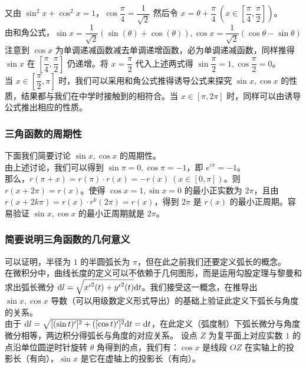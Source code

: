 \documentclass[UTF8,12pt]{ctexart}
\begin{document}
        又由 $\sin^2 x + \cos^2 x = 1$，$\cos \dfrac{\pi}{4} = \dfrac{1}{\sqrt 2}$
        然后令 $x = \theta + \dfrac{\pi}{4}\ (x \in [\dfrac{\pi}{4}, \dfrac{\pi}{2}])$。\\
        由和角公式，$\sin x = \dfrac{1}{\sqrt 2}(\sin (\theta) + \cos (\theta)), \cos x = \dfrac{1}{\sqrt 2}(\cos \theta - \sin \theta)$
        注意到 $\cos x$ 为单调递减函数减去单调递增函数，必为单调递减函数，同样推得 $\sin x$ 在 $[\dfrac{\pi}{4}, \dfrac{\pi}{2}]$ 仍递增。将 $x = \dfrac{\pi}{2}$ 代入上述两式得 $\sin \dfrac{\pi}{2} = 1, \cos \dfrac{\pi}{2} = 0$。\\
        当 $x \in [\dfrac{\pi}{2}, \pi]$ 时，我们可以采用和角公式推得诱导公式来探究 $\sin x, \cos x$ 的性质，结果都与我们在中学时接触到的相符合。当 $x \in [\pi, 2\pi]$ 时，同样可以由诱导公式推出相应的性质。
        
        \subsubsection{三角函数的周期性}
        下面我们简要讨论 $\sin x, \cos x$ 的周期性。\\
        由上述讨论，我们可以得到 $\sin \pi = 0, \cos \pi = -1$，即 $e^{i\pi} = -1$。\\
        那么，$r(\pi + x) = r(\pi)\cdot r(x) = -r(x)\ (x \in [0, \pi])$。则 $r(x + 2\pi) = r(x)$。使得 $\cos x = 1, \sin x = 0$ 的最小正实数为 $2\pi$，且由 $r(x + 2k\pi) = r(x) \cdot r^k(2\pi) = r(x)$，得到 $2\pi$ 是 $r(x)$ 的最小正周期。容易验证 $\sin x, \cos x$ 的最小正周期就是 $2\pi$。
        
        \subsubsection{简要说明三角函数的几何意义}
            可以证明，半径为 $1$ 的半圆弧长为 $\pi$，但在此之前我们还要定义弧长的概念。\\
            在微积分中，曲线长度的定义可以不依赖于几何图形，而是运用勾股定理与黎曼和求出弧长微分 ${\rm d}l = \sqrt{{x'}^2 (t) + {y'}^2 (t)}{\rm d}t$。我们接受这一概念，在推导出 $\sin x, \cos x$ 导数（可以用级数定义形式导出）的基础上验证此定义下弧长与角度的关系。\\
            由于 ${\rm d}l = \sqrt{[(\sin t)']^2 + ([\cos t)']^2}{\rm d} t = {\rm d}t$，在此定义（弧度制）下弧长微分与角度微分相等，两边积分得弧长与角度的对应关系。
            设点 $Z$ 为复平面上对应实数 $1$ 的点沿单位圆逆时针旋转 $\theta$ 角得到的点，我们有：$\cos x$ 是线段 $OZ$ 在实轴上的投影长（有向），$\sin x$ 是它在虚轴上的投影长（有向）。
\end{document}
